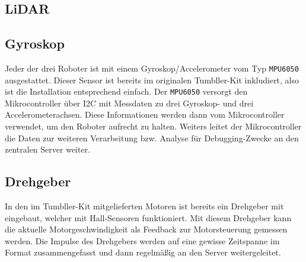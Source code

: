 \subsection{LiDAR}
\label{subsec:ueberblick_lidar}

\subsection{Gyroskop}
Jeder der drei Roboter ist mit einem Gyroskop/Accelerometer vom Typ \texttt{MPU6050} ausgestattet.
%
Dieser Sensor ist bereits im originalen Tumbller-Kit inkludiert, also ist die Installation entsprechend einfach.
%
Der \texttt{MPU6050} versorgt den Mikrocontroller über I2C mit Messdaten zu drei Gyroskop- und drei Accelerometerachsen.
%
Diese Informationen werden dann vom Mikrocontroller verwendet, um den Roboter aufrecht zu halten.
%
Weiters leitet der Mikrocontroller die Daten zur weiteren Verarbeitung bzw. Analyse für Debugging-Zwecke an den zentralen Server weiter.

\subsection{Drehgeber}
\label{subsec:ueberblick_rot_enc}
In den im Tumbller-Kit mitgelieferten Motoren ist bereits ein Drehgeber mit eingebaut,
welcher mit Hall-Sensoren funktioniert.
%
Mit diesem Drehgeber kann die aktuelle Motorgeschwindigkeit als Feedback zur Motorsteuerung gemessen werden.
%
Die Impulse des Drehgebers werden auf eine gewisse Zeitspanne im Format zusammengefasst und dann regelmäßig an den Server weitergeleitet.